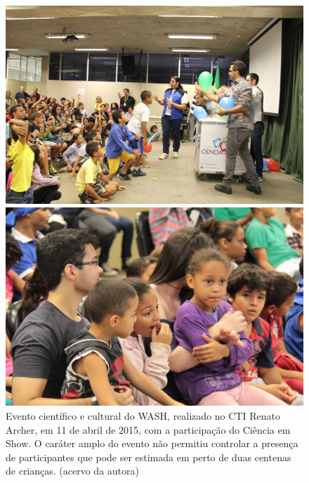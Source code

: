 \documentclass[
12pt,		%
openright,	%
twoside,  %
a4paper,			%
chapter=TITLE,		%
english,			%
french,				%
spanish,			%
brazil				%
]{USPSC-classe/USPSC}
\begin{document}
\captionsetup{format=plain}
\begin{figure}[max size={\textwidth}{\textheight}]

\centering


\begin{minipage}[b]{0.4\linewidth}
        \centering
                \includegraphics[width=1.0\linewidth]{../../imagens/Evento-Ciencia-Em-Show.jpg}
                \caption{Evento cient\'{i}fico e cultural do WASH, realizado no CTI Renato Archer, em 11 de abril de 2015, com a participa\c{c}\~ao do Ci\^encia em Show. O car\'ater amplo do evento n\~ao permitiu controlar a presen\c{c}a de participantes que pode ser estimada em perto de duas centenas de crian\c{c}as. (acervo da autora)}
                \label{5340059e38852932c32c5ce8624858fef8a1f3f0}
\end{minipage}%
\hspace{0.5cm}
\begin{minipage}[b]{0.4\linewidth}
        \centering
                \includegraphics[width=1.0\linewidth]{../../imagens/dia-das-criancas-2022-10-03-menor.JPG}

\end{minipage}
\end{figure}
\end{document}
